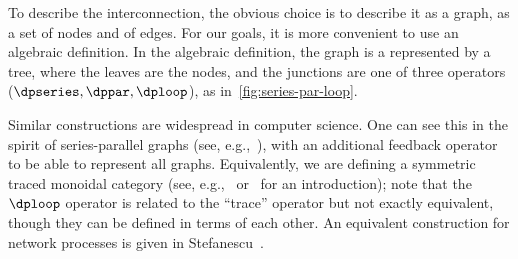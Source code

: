 To describe the interconnection, the obvious choice is to describe
it as a graph, as a set of nodes and of edges. For our goals, it is
more convenient to use an algebraic definition. In the algebraic definition,
the graph is a represented by a tree, where the leaves are the nodes,
and the junctions are one of three operators ($\dpseries,\dppar,\dploop$),
as in~\cref{fig:series-par-loop}.

Similar constructions are widespread in computer science. One can
see this in the spirit of series-parallel graphs (see, e.g.,~\cite{duffin65topology}),
with an additional feedback operator to be able to represent all graphs.
Equivalently, we are defining a symmetric traced monoidal category
(see, e.g.,~\cite{joyal96traced} or~\cite{spivak14category} for
an introduction); note that the~$\dploop$ operator is related to
the ``trace'' operator but not exactly equivalent, though they can
be defined in terms of each other. An equivalent construction for
network processes is given in Stefanescu~\cite{stefanescu00}.

